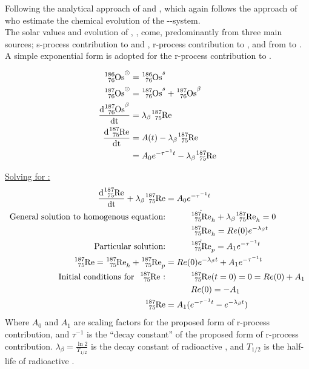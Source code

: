 
\renewcommand{\d}[1]{\frac{\textrm{d}#1}{\textrm{dt}}}
\newcommand{\pd}[2]{\frac{\partial #1}{\partial #2}}

Following the analytical approach of  and , which again follows the approach of  who estimate the chemical evolution of the --system. \\
The solar values and evolution of , ,  come, predominantly from three main sources;
s-process contribution to  and , r-process contribution to ,
and \betadecay from  to .
A simple exponential form is adopted for the r-process contribution to .

\begin{align*}
  \os{186}^\odot &= \os{186}^s \\
  \os{187}^\odot &= \os{187}^s + \os{187}^\beta \\
  \d{\os{187}^\beta} &= \lambda_\beta\re{187} \\
  \d{\re{187}} &= A(t) - \lambda_\beta\re{187} \\
  &= A_0e^{-\tau^{-1}t} - \lambda_\beta\re{187} \\
\end{align*}

\underline{Solving for :}
\begin{align*}
  \d{\re{187}} + \lambda_\beta \re{187} &= A_0e^{-\tau^{-1}t} \\
  \textrm{General solution to homogenous equation:}
  & \hspace{3em} \dot{\re{187}}_h + \lambda_\beta \re{187}_h = 0 \\
  & \hspace{3em} \re{187}_h = Re(0) e^{-\lambda_\beta t} \\
  \textrm{Particular solution:}
  & \hspace{3em} \dot{\re{187}}_p = A_1 e^{-\tau^{-1}t} \\
  \re{187} = \re{187}_h + \re{187}_p &= Re(0) e^{-\lambda_\beta t} + A_1 e^{-\tau^{-1}t} \\
  \textrm{Initial conditions for \re{187}:}
  & \hspace{3em} \re{187}(t=0) = 0 = Re(0) + A_1 \\
  & \hspace{3em} Re(0) = - A_1 \\
  \re{187} &= A_1 (e^{-\tau^{-1}t} - e^{-\lambda_\beta t}) \\
\end{align*}
Where $A_0$ and $A_1$ are scaling factors for the proposed form of r-process contribution, and $\tau^{-1}$ is the
``decay constant'' of the proposed form of r-process contribution.
$\lambda_\beta=\frac{\ln 2}{T_{1/2}}$ is the decay constant of radioactive , and $T_{1/2}$ is the half-life of radioactive .

